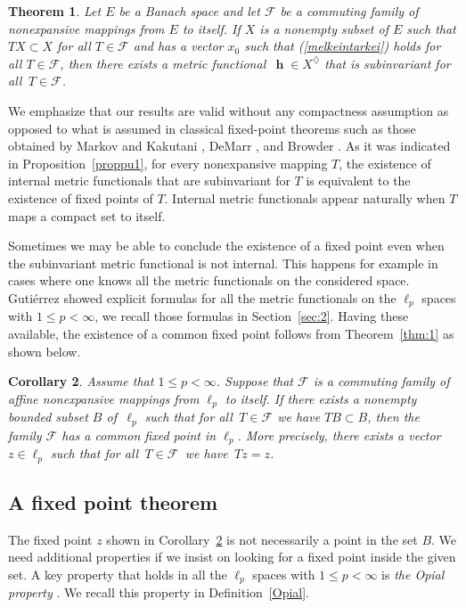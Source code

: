 \documentclass[a4paper,12pt]{article}
\newtheorem{theorem}{Theorem}[section]
\newtheorem{corollary}[theorem]{Corollary}
\theoremstyle{definition}
\numberwithin{equation}{section}
\newcommand{\F}{\mathcal{F}} %
\numberwithin{equation}{section}
\DeclareMathOperator{\h}{\mathbf{h}} %
\begin{document}
\begin{theorem}\label{thm:2}
Let $E$ be a Banach space and let $\F$ be a 
commuting family of nonexpansive mappings 
from $E$ to itself. If $X$ is a nonempty 
subset of $E$ such that $T X \subset X$ for 
all $T\in\F$ and has a vector $x_0$ such that 
\textup{(\ref{melkeintarkei})} holds for all 
$T \in \F$, then there exists a metric 
functional $\,\h\in X^\diamondsuit$ that is 
subinvariant for all $\,T\in\F$.
\end{theorem}

We emphasize that our results are valid 
without any compactness assumption as opposed 
to what is assumed in classical fixed-point 
theorems such as those obtained by Markov and 
Kakutani \cite{Markov36, Kakutani38}, 
DeMarr \cite{DeMarr1963}, and 
Browder \cite{Browder1965}. As it was 
indicated in Proposition~\ref{proppu1}, for 
every nonexpansive mapping $T$, the existence 
of internal metric functionals that are 
subinvariant for $T$ is equivalent to the 
existence of fixed points of $T$. Internal 
metric functionals appear naturally when $T$ 
maps a compact set to itself. 

Sometimes we may be able to conclude the 
existence of a fixed point even when the 
subinvariant metric functional is not 
internal. This happens for example in cases 
where one knows all the metric functionals on 
the considered space. Guti\'{e}rrez 
\cite{Gutierrez2019-2} showed explicit 
formulas for all the metric functionals on 
the $\ell_p$ spaces with $1 \leq p < \infty$, 
we recall those formulas in Section~\ref{sec:2}.  
Having these available, the existence of a 
common fixed point follows from 
Theorem~\ref{thm:1} as shown below.

\begin{corollary}\label{cor:1}  
Assume that $1\leq p<\infty$. Suppose that 
$\F$ is a commuting family of affine 
nonexpansive mappings from $\ell_{p}$ to 
itself. If there exists a nonempty bounded 
subset $B$ of $\,\ell_{p}$ such that 
for all $\,T\in\F$ we have $TB\subset B$, then 
the family $\F$ has a common fixed point
in $\ell_p$. More precisely, there exists a 
vector $z\in\ell_{p}$ such that for all 
$\,T\in\F\,$ we have $\,Tz=z$.
\end{corollary}

\subsection{A fixed point theorem}

The fixed point $z$ shown in 
Corollary~\ref{cor:1} is not necessarily a 
point in the set $B$. We need additional 
properties if we insist on looking for a 
fixed point inside the given set. A key 
property that holds in all the $\ell_p$ 
spaces with $1\leq p<\infty$ is 
\emph{the Opial property} \cite{Opial1967}. 
We recall this property in 
Definition~\ref{Opial}.  
 
\end{document}
